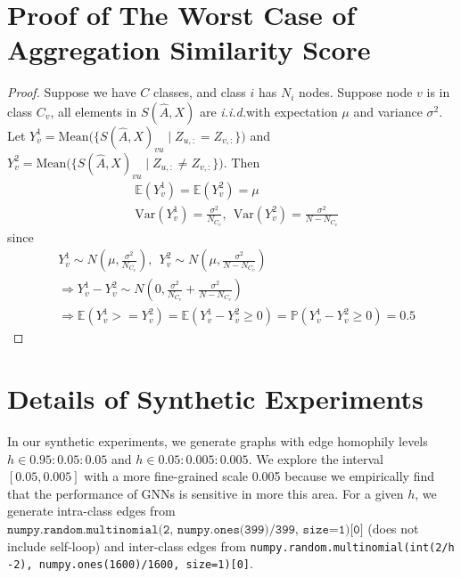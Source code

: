 \documentclass{article}
\newcommand\iid{\textit{i.i.d.}}
\newcommand{\0}{{\boldsymbol{0}}}
\newcommand{\6}{{\partial}}
\newcommand{\8}{{\infty}}
\newcommand{\4}{{\nabla}}
\begin{document}
\section{Proof of The Worst Case of Aggregation Similarity Score}
\label{appendix:worst_case_proof}
\begin{proof}
Suppose we have $C$ classes, and class $i$ has $N_i$ nodes. Suppose node $v$ is in class $C_v$,  all elements in $S(\hat{A},X)$ are \iid with expectation $\mu$ and variance $\sigma^2$. Let $Y_{v}^1 = \mathrm{Mean}\big( \{ S(\hat{A},X)_{vu} \mid Z_{u,:}=Z_{v,:} \}\big)$ and $Y_{v}^2=\mathrm{Mean}\big(\{ S(\hat{A},X)_{vu} \mid Z_{u,:} \neq Z_{v,:} \})$. Then
\begin{align*}
    &\mathbb{E}(Y_{v}^1) = \mathbb{E}(Y_{v}^2) = \mu\\
    &\mathrm{Var}(Y_{v}^1) = \frac{\sigma^2}{N_{C_v}},\ \ \mathrm{Var}(Y_{v}^2) = \frac{\sigma^2}{N-N_{C_v}}
\end{align*}
since
\begin{align*}
&Y_{v}^1 \sim N(\mu, \frac{\sigma^2}{N_{C_v}}),\ \ Y_{v}^2 \sim N(\mu,\frac{\sigma^2}{N-N_{C_v}})\\
    &\Rightarrow Y_{v}^1 - Y_{v}^2 \sim N(0, \frac{\sigma^2}{N_{C_v}} + \frac{\sigma^2}{N-N_{C_v}})\\
    & \Rightarrow \mathbb{E}(Y_{v}^1 >= Y_{v}^2) = \mathbb{E}(Y_{v}^1 - Y_{v}^2 \geq 0) = \mathbb{P}(Y_{v}^1 - Y_{v}^2 \geq 0)=0.5
\end{align*}
\end{proof}
\fi

\section{Details of Synthetic Experiments}
\label{appendix:details_syn_exps}
In our synthetic experiments, we generate graphs with edge homophily levels $h \in 0.95:0.05:0.05$ and $h \in 0.05:0.005:0.005$. We explore the interval $[0.05, 0.005]$ with a more fine-grained scale 0.005 because we empirically find that the performance of GNNs is sensitive in more this area. For a given $h$, we generate intra-class edges from $\texttt{numpy.random.multinomial(2, numpy.ones(399)/399, size=1)[0]}$ (does not include self-loop) and inter-class edges from \texttt{numpy.random.multinomial(int(2/h -2), numpy.ones(1600)/1600, size=1)[0]}.
\end{document}
